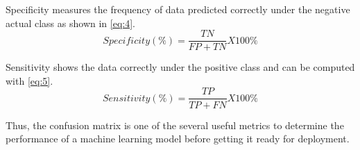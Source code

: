 Specificity measures the frequency of data predicted correctly under the negative actual class as shown in \ref{eq:4}. 
\begin{equation}
    Specificity(\%) = \frac{TN}{FP+TN} X100\% 
    \label{eq:4}
\end{equation}

Sensitivity shows the data correctly under the positive class and can be computed  with \ref{eq:5}.
\begin{equation}
    Sensitivity(\%) = \frac{TP}{TP+FN} X100\% 
    \label{eq:5}
\end{equation}

Thus, the confusion matrix is one of the several useful metrics to determine the performance of a machine learning model before getting it ready for deployment.



